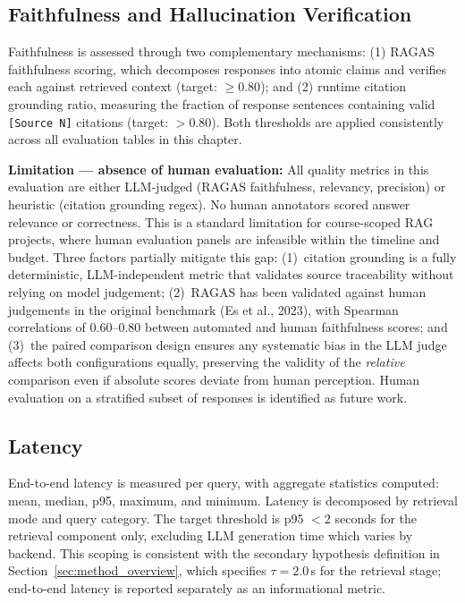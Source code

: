 \subsection{Faithfulness and Hallucination Verification}

Faithfulness is assessed through two complementary mechanisms: (1) RAGAS faithfulness scoring, which decomposes responses into atomic claims and verifies each against retrieved context (target: $\geq 0.80$); and (2) runtime citation grounding ratio, measuring the fraction of response sentences containing valid \texttt{[Source N]} citations (target: $> 0.80$). Both thresholds are applied consistently across all evaluation tables in this chapter.

\textbf{Limitation --- absence of human evaluation:} All quality metrics in this evaluation are either LLM-judged (RAGAS faithfulness, relevancy, precision) or heuristic (citation grounding regex). No human annotators scored answer relevance or correctness. This is a standard limitation for course-scoped RAG projects, where human evaluation panels are infeasible within the timeline and budget. Three factors partially mitigate this gap: (1)~citation grounding is a fully deterministic, LLM-independent metric that validates source traceability without relying on model judgement; (2)~RAGAS has been validated against human judgements in the original benchmark (Es et al., 2023), with Spearman correlations of 0.60--0.80 between automated and human faithfulness scores; and (3)~the paired comparison design ensures any systematic bias in the LLM judge affects both configurations equally, preserving the validity of the \emph{relative} comparison even if absolute scores deviate from human perception. Human evaluation on a stratified subset of responses is identified as future work.

\subsection{Latency}

End-to-end latency is measured per query, with aggregate statistics computed: mean, median, p95, maximum, and minimum. Latency is decomposed by retrieval mode and query category. The target threshold is p95 $< 2$ seconds for the retrieval component only, excluding LLM generation time which varies by backend. This scoping is consistent with the secondary hypothesis definition in Section~\ref{sec:method_overview}, which specifies $\tau = 2.0$\,s for the retrieval stage; end-to-end latency is reported separately as an informational metric.

